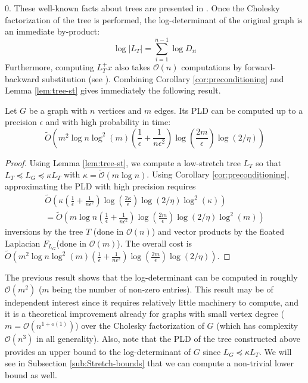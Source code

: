 $0$. These well-known facts about trees are presented in \cite{Spielman2009a}.
Once the Cholesky factorization of the tree is performed, the log-determinant
of the original graph is an immediate by-product: 
\[
\log\left|L_{T}\right|=\sum_{i=1}^{n-1}\log D_{ii}
\]
Furthermore, computing $L_{T}^{+}x$ also takes $\mathcal{O}\left(n\right)$
computations by forward-backward substitution (see \cite{duff1986direct}).
Combining Corollary \ref{cor:preconditioning} and Lemma \eqref{lem:tree-st}
gives immediately the following result.
\begin{theorem}
\label{thm:PLD-tree}Let $G$ be a graph with $n$ vertices and $m$
edges. Its PLD can be computed up to a precision $\epsilon$ and with
high probability in time: 
\[
\tilde{O}\left(m^{2}\log n\log^{2}\left(m\right)\left(\frac{1}{\epsilon}+\frac{1}{n\epsilon^{2}}\right)\log\left(\frac{2m}{\epsilon}\right)\log\left(2/\eta\right)\right)
\]
\end{theorem}
\begin{proof}
Using Lemma \eqref{lem:tree-st}, we compute a low-stretch tree $L_{T}$
so that $L_{T}\preceq L_{G}\preceq\kappa L_{T}$ with $\kappa=\tilde{\mathcal{O}}\left(m\log n\right)$.
Using Corollary \eqref{cor:preconditioning}, approximating the PLD
with high precision requires 
\begin{eqnarray*}
\tilde{O}\left(\kappa\left(\frac{1}{\epsilon}+\frac{1}{n\epsilon^{2}}\right)\log\left(\frac{2\kappa}{\epsilon}\right)\log\left(2/\eta\right)\log^{2}\left(\kappa\right)\right)\\
=\tilde{O}\left(m\log n\left(\frac{1}{\epsilon}+\frac{1}{n\epsilon^{2}}\right)\log\left(\frac{2m}{\epsilon}\right)\log\left(2/\eta\right)\log^{2}\left(m\right)\right)
\end{eqnarray*}
inversions by the tree $T$ (done in $\mathcal{O}\left(n\right)$)
and vector products by the floated Laplacian $F_{L_{G}}$(done in
$\mathcal{O}\left(m\right)$). The overall cost is $\tilde{O}\left(m^{2}\log n\log^{2}\left(m\right)\left(\frac{1}{\epsilon}+\frac{1}{n\epsilon^{2}}\right)\log\left(\frac{2m}{\epsilon}\right)\log\left(2/\eta\right)\right)$. 
\end{proof}
The previous result shows that the log-determinant can be computed
in roughly $\mathcal{O}\left(m^{2}\right)$ ($m$ being the number
of non-zero entries). This result may be of independent interest since
it requires relatively little machinery to compute, and it is a theoretical
improvement already for graphs with small vertex degree ($m=\mathcal{O}\left(n^{1+o\left(1\right)}\right)$)
over the Cholesky factorization of $G$ (which has complexity $\mathcal{O}\left(n^{3}\right)$
in all generality). Also, note that the PLD of the tree constructed
above provides an upper bound to the log-determinant of $G$ since
$L_{G}\preceq\kappa L_{T}$. We will see in Subsection \ref{sub:Stretch-bounds}
that we can compute a non-trivial lower bound as well. 
